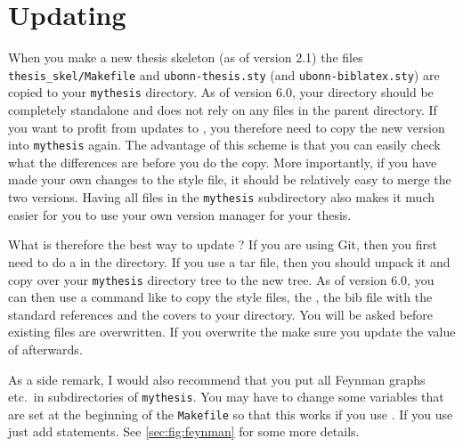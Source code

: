 \section{Updating }%
\label{sec:tips:update}

When you make a new thesis skeleton (as of version 2.1) the files
\texttt{thesis\_skel/Makefile} and \texttt{ubonn-thesis.sty}
(and \texttt{ubonn-biblatex.sty}) are copied
to your \texttt{mythesis} directory.
As of version 6.0, your  directory should be completely standalone
and does not rely on any files in the parent directory.
If you want to profit from updates to ,
you therefore need to copy the new version into \texttt{mythesis} again.
The advantage of this scheme is
that you can easily check what the differences are before you do the
copy. More importantly, if you have made your own changes to the style
file, it should be relatively easy to merge the two versions. Having
all files in the \texttt{mythesis} subdirectory also makes it much easier
for you to use your own version manager for your thesis.

What is therefore the best way to update ?
If you are using Git, then you first need to do a 
in the  directory.
If you use a tar file, then you should unpack it and copy over your
\texttt{mythesis} directory tree to the new  tree.
As of version 6.0, you can then use a command like
 to copy the style files,
the , the bib file with the standard references and the covers to your
 directory.
You will be asked before existing files are overwritten.
If you overwrite the  make sure you update the value of  afterwards.

As a side remark, I would also recommend that you put all Feynman
graphs etc.\ in subdirectories of \texttt{mythesis}. You may have to
change some variables that are set at the beginning of the
\texttt{Makefile} so that this works if you use . If
you use  just add  statements.
See \cref{sec:fig:feynman} for some more details.
